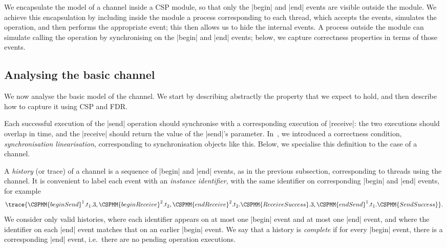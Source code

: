 We encapsulate the model of a channel inside a CSP module, so that only the
|begin| and |end| events are visible outside the module.  We achieve this
encapsulation by including inside the module a process corresponding to each
thread, which accepts the  events, simulates the operation, and
then performs the appropriate  event; this then allows us to hide
the internal events.  A process outside the module can simulate calling the
operation by synchronising on the |begin| and |end| events; below, we capture
correctness properties in terms of those events.



\inlineCSP

\subsection{Analysing the basic channel}
\label{sec:syncchan-analysis-1}

We now analyse the basic model of the channel.  We start by describing
abstractly the property that we expect to hold, and then describe how to
capture it using CSP and FDR.

Each successful execution of the |send| operation should synchronise with a
corresponding execution of |receive|: the two executions should overlap in
time, and the |receive| should return the value of the |send|'s parameter.
In~\cite{LL:synchronisation}, we introduced a correctness condition,
\emph{synchronisation linearisation}, corresponding to synchronisation objects
like this.  Below, we specialise this definition to the case of a channel.

A \emph{history} (or trace) of a channel is a sequence of |begin| and |end|
events, as in the previous subsection, corresponding to threads using the
channel.  It is convenient to label each event with an \emph{instance
  identifier}, with the same identifier on corresponding |begin| and |end|
events, for example
\[
\trace{\CSPMM{beginSend}^1.t_1.3, \CSPMM{beginReceive}^2.t_2,
  \CSPMM{endReceive}^2.t_2.\CSPMM{ReceiveSuccess}.3, 
  \CSPMM{endSend}^1.t_1.\CSPMM{SendSuccess} }.
\]
We consider only valid histories, where each identifier appears on at most one
|begin| event and at most one |end| event, and where the identifier on each
|end| event matches that on an earlier |begin| event.  We say that a history
is \emph{complete} if for every |begin| event, there is a corresponding |end|
event, i.e.~there are no pending operation executions.

